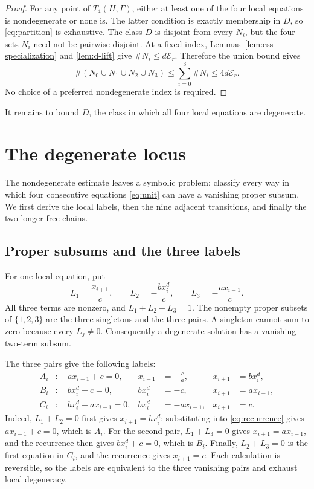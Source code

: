 \documentclass[11pt]{article}
\theoremstyle{definition}
\theoremstyle{remark}
\newcommand{\Er}{\mathcal{E}_{r}}
\begin{document}
\begin{proof}
For any point of \(T_4(H,\Gamma)\), either at least one of the four local
equations is nondegenerate or none is.  The latter condition is exactly
membership in \(D\), so \eqref{eq:partition} is exhaustive.  The class \(D\)
is disjoint from every \(N_i\), but the four sets \(N_i\) need not be
pairwise disjoint.  At a fixed index, Lemmas~\ref{lem:ess-specialization}
and \ref{lem:d-lift} give \(\#N_i\le d\Er\).  Therefore the union bound gives
\[
 \#(N_0\cup N_1\cup N_2\cup N_3)
 \le\sum_{i=0}^3\#N_i
 \le4d\Er.
\]
No choice of a preferred nondegenerate index is required.
\end{proof}

It remains to bound \(D\), the class in which all four local equations are
degenerate.

\section{The degenerate locus}\label{sec:degenerate}

The nondegenerate estimate leaves a symbolic problem: classify every way in
which four consecutive equations \eqref{eq:unit} can have a vanishing proper
subsum.  We first derive the local labels, then the nine adjacent
transitions, and finally the two longer free chains.

\subsection{Proper subsums and the three labels}

For one local equation, put
\begin{equation}\label{eq:L}
 L_1=\frac{x_{i+1}}c,\qquad
 L_2=-\frac{b x_i^d}c,\qquad
 L_3=-\frac{a x_{i-1}}c.
\end{equation}
All three terms are nonzero, and \(L_1+L_2+L_3=1\).  The nonempty proper
subsets of \(\{1,2,3\}\) are the three singletons and the three pairs.  A
singleton cannot sum to zero because every \(L_j\ne0\).  Consequently a
degenerate solution has a vanishing two-term subsum.

The three pairs give the following labels:
\begin{equation}\label{eq:labels}
\begin{aligned}
 A_i&:\quad a x_{i-1}+c=0,
 &x_{i-1}&=-\frac ca,
 &x_{i+1}&=b x_i^d,\\
 B_i&:\quad b x_i^d+c=0,
 &b x_i^d&=-c,
 &x_{i+1}&=a x_{i-1},\\
 C_i&:\quad b x_i^d+a x_{i-1}=0,
 &b x_i^d&=-a x_{i-1},
 &x_{i+1}&=c.
\end{aligned}
\end{equation}
Indeed, \(L_1+L_2=0\) first gives
\(x_{i+1}=b x_i^d\); substituting into \eqref{eq:recurrence} gives
\(a x_{i-1}+c=0\), which is \(A_i\).  For the second pair, \(L_1+L_3=0\) gives \(x_{i+1}=a x_{i-1}\), and the recurrence then gives
\(b x_i^d+c=0\), which is \(B_i\).  Finally,
\(L_2+L_3=0\) is the first equation in \(C_i\), and the recurrence gives
\(x_{i+1}=c\).  Each calculation is reversible, so the labels are
equivalent to the three vanishing pairs and exhaust local degeneracy.
\end{document}
